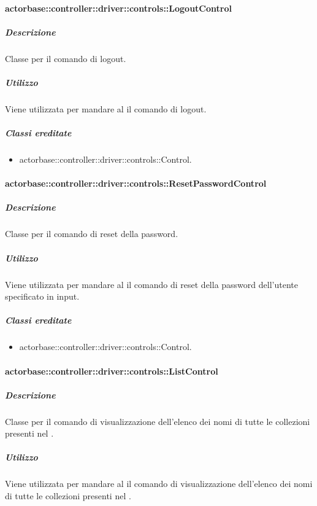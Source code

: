 \documentclass{scalatekids-article}
\begin{document}
\paragraph{actorbase::controller::driver::controls::LogoutControl}

\subparagraph{Descrizione}

Classe per il comando di logout.

\subparagraph{Utilizzo}

Viene utilizzata per mandare al  il comando di logout.

\subparagraph{Classi ereditate}

\begin{itemize}
\item actorbase::controller::driver::controls::Control.
\end{itemize}

\paragraph{actorbase::controller::driver::controls::ResetPasswordControl}

\subparagraph{Descrizione}

Classe per il comando di reset della password.

\subparagraph{Utilizzo}

Viene utilizzata per mandare al  il comando di reset della
password dell'utente specificato in input.

\subparagraph{Classi ereditate}

\begin{itemize}
\item actorbase::controller::driver::controls::Control.
\end{itemize}

\paragraph{actorbase::controller::driver::controls::ListControl}

\subparagraph{Descrizione}

Classe per il comando di visualizzazione dell'elenco dei nomi di tutte le
collezioni presenti nel .

\subparagraph{Utilizzo}

Viene utilizzata per mandare al  il comando di visualizzazione
dell'elenco dei nomi di tutte le collezioni presenti nel .
\end{document}
